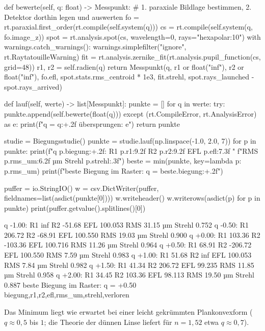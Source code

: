 \documentclass[11pt,a4paper,openany]{book}
\DeclareRobustCommand{\code}[1]{\texttt{\directlua{rttcode("\luaescapestring{\detokenize{#1}}")}}}
\begin{document}
\begin{pycode}[title={\code{ex18_anwendung.py}}]
    def bewerte(self, q: float) -> Messpunkt:
        # 1. paraxiale Bildlage bestimmen, 2. Detektor dorthin legen und auswerten
        fo = rt.paraxial.first_order(rt.compile(self.system(q)))
        cs = rt.compile(self.system(q, fo.image_z))
        spot = rt.analysis.spot(cs, wavelength=0, rays="hexapolar:10")
        with warnings.catch_warnings():
            warnings.simplefilter("ignore", rt.RaytatouilleWarning)
            fit = rt.analysis.zernike_fit(rt.analysis.pupil_function(cs, grid=48))
        r1, r2 = self.radien(q)
        return Messpunkt(q, r1 or float("inf"), r2 or float("inf"), fo.efl,
                         spot.stats.rms_centroid * 1e3, fit.strehl,
                         spot.rays_launched - spot.rays_arrived)

    def lauf(self, werte) -> list[Messpunkt]:
        punkte = []
        for q in werte:
            try:
                punkte.append(self.bewerte(float(q)))
            except (rt.CompileError, rt.AnalysisError) as e:
                print(f"q = {q:+.2f} übersprungen: {e}")
        return punkte


studie = Biegungsstudie()
punkte = studie.lauf(np.linspace(-1.0, 2.0, 7))
for p in punkte:
    print(f"q {p.biegung:+.2f}: R1 {p.r1:9.2f}  R2 {p.r2:9.2f}  EFL {p.efl:7.3f}  "
          f"RMS {p.rms_um:6.2f} µm  Strehl {p.strehl:.3f}")
beste = min(punkte, key=lambda p: p.rms_um)
print(f"beste Biegung im Raster: q = {beste.biegung:+.2f}")

puffer = io.StringIO()
w = csv.DictWriter(puffer, fieldnames=list(asdict(punkte[0])))
w.writeheader()
w.writerows(asdict(p) for p in punkte)
print(puffer.getvalue().splitlines()[0])
\end{pycode}
\begin{ausgabe}
q -1.00: R1       inf  R2    -51.68  EFL 100.053  RMS  31.15 µm  Strehl 0.752
q -0.50: R1    206.72  R2    -68.91  EFL 100.550  RMS  19.03 µm  Strehl 0.900
q +0.00: R1    103.36  R2   -103.36  EFL 100.716  RMS  11.26 µm  Strehl 0.964
q +0.50: R1     68.91  R2   -206.72  EFL 100.550  RMS   7.59 µm  Strehl 0.983
q +1.00: R1     51.68  R2       inf  EFL 100.053  RMS   7.84 µm  Strehl 0.982
q +1.50: R1     41.34  R2    206.72  EFL  99.235  RMS  11.85 µm  Strehl 0.958
q +2.00: R1     34.45  R2    103.36  EFL  98.113  RMS  19.50 µm  Strehl 0.887
beste Biegung im Raster: q = +0.50
biegung,r1,r2,efl,rms_um,strehl,verloren
\end{ausgabe}

Das Minimum liegt wie erwartet bei einer leicht gekrümmten Plankonvexform ($q\approx0{,}5$ bis
$1$; die Theorie der dünnen Linse liefert für $n=1{,}52$ etwa $q\approx0{,}7$).
\end{document}
